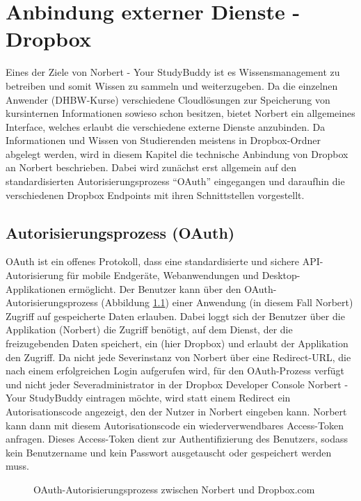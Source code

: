 

\chapter{Anbindung externer Dienste - Dropbox}

Eines der Ziele von Norbert - Your StudyBuddy ist es Wissensmanagement zu betreiben und somit Wissen zu sammeln und weiterzugeben.
Da die einzelnen Anwender (DHBW-Kurse) verschiedene Cloudlösungen zur Speicherung von kursinternen Informationen sowieso schon besitzen, bietet Norbert ein allgemeines Interface, welches erlaubt die verschiedene externe Dienste anzubinden.
Da Informationen und Wissen von Studierenden meistens in Dropbox-Ordner abgelegt werden, wird in diesem Kapitel die technische Anbindung von Dropbox an Norbert beschrieben. Dabei wird zunächst erst allgemein auf den standardisierten Autorisierungsprozess \enquote{OAuth} eingegangen und daraufhin die verschiedenen Dropbox Endpoints mit ihren Schnittstellen vorgestellt.


\section{Autorisierungsprozess (OAuth)}

OAuth ist ein offenes Protokoll, dass eine standardisierte und sichere API-Autorisierung für mobile Endgeräte, Webanwendungen und Desktop-Applikationen ermöglicht. Der Benutzer kann über den OAuth-Autorisierungsprozess (Abbildung \ref{04ergebnis:oauth}) einer Anwendung (in diesem Fall Norbert) Zugriff auf gespeicherte Daten erlauben. Dabei loggt sich der Benutzer über die Applikation (Norbert) die Zugriff benötigt, auf dem Dienst, der die freizugebenden Daten speichert, ein (hier Dropbox) und erlaubt der Applikation den Zugriff. Da nicht jede Severinstanz von Norbert über eine Redirect-URL, die nach einem erfolgreichen Login aufgerufen wird, für den OAuth-Prozess verfügt und nicht jeder Severadministrator in der Dropbox Developer Console Norbert - Your StudyBuddy eintragen möchte, wird statt einem Redirect ein Autorisationscode angezeigt, den der Nutzer in Norbert eingeben kann. Norbert kann dann mit diesem Autorisationscode ein wiederverwendbares Access-Token anfragen. Dieses Access-Token dient zur Authentifizierung des Benutzers, sodass kein Benutzername und kein Passwort ausgetauscht oder gespeichert werden muss.

\begin{figure}[H]
\centering
	\scalebox{0.5}{}
	\caption{OAuth-Autorisierungsprozess zwischen Norbert und Dropbox.com}
	\label{04ergebnis:oauth}	
\end{figure}


